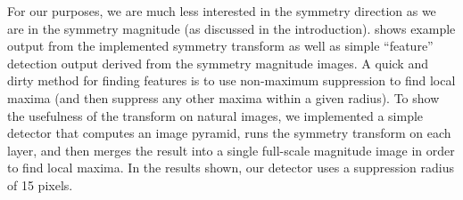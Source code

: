 For our purposes, we are much less interested in the symmetry direction as we are in the symmetry magnitude (as discussed in the introduction).  shows example output from the implemented symmetry transform as well as simple ``feature'' detection output derived from the symmetry magnitude images. A quick and dirty method for finding features is to use non-maximum suppression to find local maxima (and then suppress any other maxima within a given radius). To show the usefulness of the transform on natural images, we implemented a simple detector that computes an image pyramid, runs the symmetry transform on each layer, and then merges the result into a single full-scale magnitude image in order to find local maxima. In the results shown, our detector uses a suppression radius of 15 pixels. 

\Needspace{0.8\textheight}
